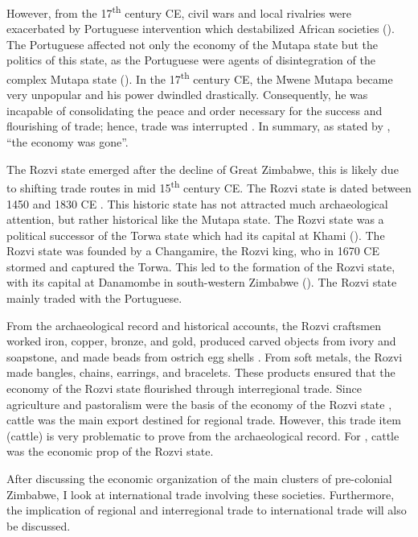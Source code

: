 However, from the 17\textsuperscript{th} century CE,
civil wars and local rivalries were exacerbated by Portuguese intervention which destabilized African societies (\cites{chanaiwa1972}{alradi1990}{kinahan2000}).
The Portuguese affected not only the economy of the Mutapa state but the politics of this state, as the Portuguese were agents of disintegration of the complex Mutapa state (\cite[][435]{chanaiwa1972}).
In the 17\textsuperscript{th} century CE, the Mwene Mutapa became very unpopular and his power dwindled drastically. Consequently, he was incapable of consolidating the peace and order necessary for the success and flourishing of trade; hence, trade was interrupted \parencite{chanaiwa1972}.
In summary, as stated by \textcite[][435]{chanaiwa1972}, \enquote{the economy was gone}.


The Rozvi state emerged after the decline of Great Zimbabwe, this is likely due to shifting trade routes in mid 15\textsuperscript{th} century CE. The Rozvi state is dated between 1450 and 1830 CE \parencite{pikirayi2006}. This historic state has not attracted much archaeological attention, but rather historical like the Mutapa state. The Rozvi state was a political successor of the Torwa state which had its capital at Khami
(\cites{pikirayi2006}{pikirayi2013hist}{manyanga2010}). The Rozvi state was founded by a Changamire, the Rozvi king, who in 1670 CE stormed and captured the Torwa. This led to the formation of the Rozvi state, with its capital at Danamombe in south-western Zimbabwe (\cites{mudenge1988}{beach1980}[][17]{huffman1996}). The Rozvi state mainly traded with the Portuguese.

From the archaeological record and historical accounts, the Rozvi craftsmen worked iron, copper, bronze, and gold, produced carved objects  from ivory and soapstone, and made beads from ostrich egg shells \parencite{mudenge1974}.
From soft metals, the Rozvi made bangles, chains, earrings, and bracelets. These products ensured that the economy of the Rozvi state flourished through interregional trade. Since agriculture and pastoralism were the basis of the economy of the Rozvi state \parencite{mudenge1974}, cattle was the main export destined for regional trade. However, this trade item (cattle) is very problematic to prove from the archaeological record. For \textcite{mudenge1974}, cattle was the economic prop of the Rozvi state.

After discussing the economic organization of the main clusters of pre-colonial Zimbabwe, I  look at international trade involving these societies. Furthermore, the implication of regional and interregional trade to international trade will also be discussed.

